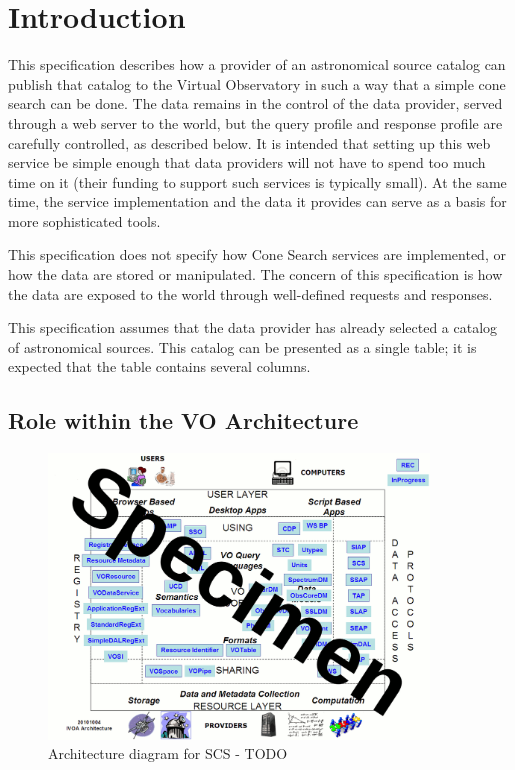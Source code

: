 \documentclass[11pt,a4paper]{ivoa}
\begin{document}
\section{Introduction}

This specification describes how a provider of an astronomical source catalog can publish that catalog to the Virtual Observatory in such a way that a simple cone search can be done. The data remains in the control of the data provider, served through a web server to the world, but the query profile and response profile are carefully controlled, as described below. It is intended that setting up this web service be simple enough that data providers will not have to spend too much time on it (their funding to support such services is typically small). At the same time, the service implementation and the data it provides can serve as a basis for more sophisticated tools.

This specification does not specify how Cone Search services are implemented, or how the data are stored or manipulated. The concern of this specification is how the data are exposed to the world through well-defined requests and responses.

This specification assumes that the data provider has already selected a catalog of astronomical sources. This catalog can be presented as a single table; it is expected that the table contains several columns.

\subsection{Role within the VO Architecture}

\begin{figure}
\centering


\includegraphics[width=0.9\textwidth]{archdiag.png}
\caption{Architecture diagram for SCS - TODO}
\label{fig:archdiag}
\end{figure}
\end{document}
